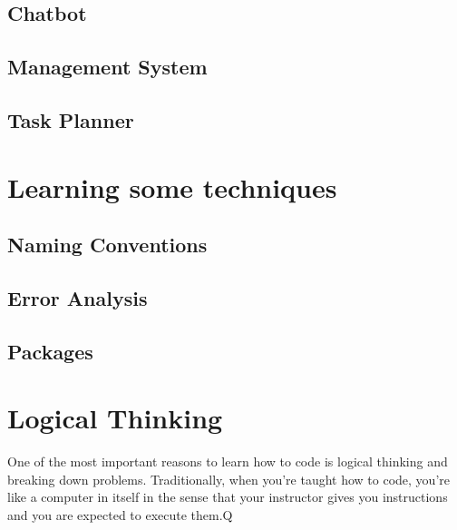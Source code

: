 \documentclass[12pt,a4paper]{book}
\begin{document}
		\section{Chatbot}
			\vspace{30cm}
			
		\section{Management System}
			\vspace{30cm}
			
		\section{Task Planner}
			\vspace{30cm}
			
	\chapter{Learning some techniques}  \label{chap:techniques}
		\section{Naming Conventions}
			\vspace{20cm}

		\section{Error Analysis}
			\vspace{30cm}

		\section{Packages}
			\vspace{20cm}
	
	\chapter{Logical Thinking}  \label{chap:logical-thinking}
		One of the most important reasons to learn how to code is logical thinking and breaking down problems. Traditionally, when you're taught how to code, you're like a computer in itself in the sense that your instructor gives you instructions and you are expected to execute them.Q
\end{document}
